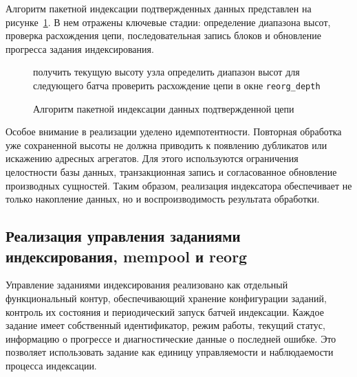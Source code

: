 Алгоритм пакетной индексации подтвержденных данных представлен на
рисунке~\ref{alg:index-batch}. В нем отражены ключевые стадии: определение
диапазона высот, проверка расхождения цепи, последовательная запись блоков и
обновление прогресса задания индексирования.

\begin{figure}
\begin{minipage}{\linewidth}
\begin{algorithm}[H]
    \SetAlgoVlined
    получить текущую высоту узла\;
    определить диапазон высот для следующего батча\;
    проверить расхождение цепи в окне \texttt{reorg\_depth}\;
\end{algorithm}
\end{minipage}
\caption{Алгоритм пакетной индексации данных подтвержденной цепи}
\label{alg:index-batch}
\end{figure}

Особое внимание в реализации уделено идемпотентности. Повторная обработка уже
сохраненной высоты не должна приводить к появлению дубликатов или искажению
адресных агрегатов. Для этого используются ограничения целостности базы
данных, транзакционная запись и согласованное обновление производных
сущностей. Таким образом, реализация индексатора обеспечивает не только
накопление данных, но и воспроизводимость результата обработки.

\subsection{Реализация управления заданиями индексирования, mempool и reorg}

Управление заданиями индексирования реализовано как отдельный функциональный
контур, обеспечивающий хранение конфигурации заданий, контроль их состояния и периодический запуск
батчей индексации. Каждое задание имеет собственный идентификатор, режим
работы, текущий статус, информацию о прогрессе и диагностические данные о
последней ошибке. Это позволяет использовать задание как единицу управляемости и
наблюдаемости процесса индексации.

